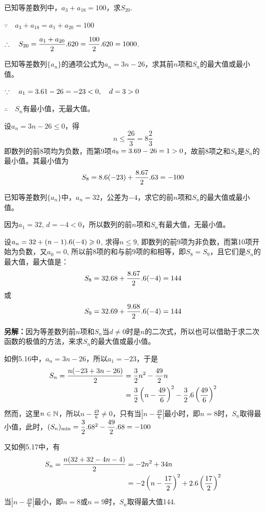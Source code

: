 \begin{example}
    已知等差数列中，$a_3+a_{18}=100$，求$S_{20}$.
\end{example}

\begin{solution}
$\because\quad a_3+a_{18}=a_1+a_{20}=100$

$\therefore\quad S_{20}=\dfrac{a_1+a_{20}}{2}.620=\dfrac{100}{2}.6 20=1000$.
\end{solution}


\begin{example}
    已知等差数列$\{a_n\}$的通项公式为$a_n=3n-26$，求其前$n$项和$S_n$的最大值或最小值。
\end{example}

\begin{solution}
 $\because\quad    a_1=3.6 1-26=-23<0,\quad d=3>0$

 $\therefore\quad S_n$有最小值，无最大值。

 设$a_n=3n-26\le 0$，得
\[n\le \frac{26}{3}=8\frac{2}{3}\]
即数列的前8项均为负数，而第9项$a_9=3.69-26=1>0$，故前8项之和$S_8$是$S_n$的最小值。其最小值为
\[S_8=8.6(-23)+\dfrac{8.67}{2}.63=-100\]
\end{solution}

\begin{example}
    已知等差数列$\{a_n\}$中，$a_n=32$，公差为$-4$，求它的前$n$项和$S_n$的最大值或最小值。
\end{example}

\begin{solution}
    因为$a_1=32$, $d=-4<0$，所以数列的前$n$项和$S_n$有最大值，无最小值。

    设$a_n=32+(n-1).6(-4)\geqslant 0$, 求得$n\le 9$, 
即数列的前9项为非负数，而第10项开始为负数，又$a_0=0$, 所以前8项的和与前9项的和相等，即$S_8=S_9$，且它们是$S_n$的最大值，最大值是：
\[S_8=32.68+\dfrac{8.67}{2}.6(-4)=144\]
或
\[S_9=32.69+\dfrac{9.68}{2}.6(-4)=144\]

\textbf{另解：}因为等差数列前$n$项和$S_n$当$d\ne 0$时是$n$的二次式，所以也可以借助于求二次函数的极值的方法，来求$S_n$的最大值或最小值。

如例5.16中，$a_n=3n-26$，所以$a_1=-23$，于是
\[\begin{split}
    S_n=\dfrac{n(-23+3n-26)}{2}&=\dfrac{3}{2}n^2-\dfrac{49}{2}n\\
    &=\dfrac{3}{2}\left(n-\dfrac{49}{6}\right)^2-\dfrac{3}{2}.6 \left(\dfrac{49}{6}\right)^2
\end{split}\]
然而，这里$n\in\mathbb{N}$，所以$n-\frac{49}{6}\ne 0$，只有当$\left|n-\frac{49}{6}\right|$最小时，即$n=8$时，$S_n$取得最小值，此时，$(S_n)_{\min}=\dfrac{3}{2}.6 8^2-\dfrac{49}{2}.6 8=-100$

又如例5.17中，有
\[\begin{split}
    S_n=\dfrac{n(32+32-4n-4)}{2}&=-2n^2+34n\\
    &=-2\left(n-\dfrac{17}{2}\right)^2+2.6 \left(\dfrac{17}{2}\right)^2
\end{split}\]
当$\left|n-\frac{49}{6}\right|$最小，即$n=8$或$n=9$时，$S_n$取得最大值144.
\end{solution}


